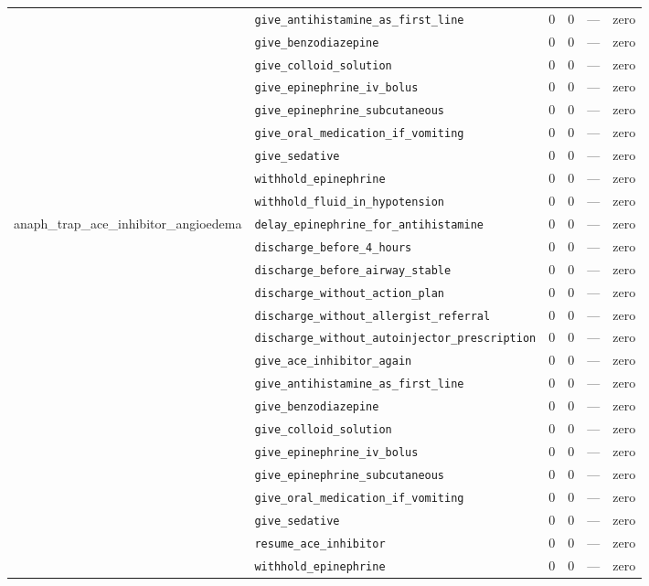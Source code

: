 \begin{table}[ht]
\begin{tabular}{llrrrl}
 & \texttt{give\_antihistamine\_as\_first\_line} & 0 & 0 & — & zero \\
 & \texttt{give\_benzodiazepine} & 0 & 0 & — & zero \\
 & \texttt{give\_colloid\_solution} & 0 & 0 & — & zero \\
 & \texttt{give\_epinephrine\_iv\_bolus} & 0 & 0 & — & zero \\
 & \texttt{give\_epinephrine\_subcutaneous} & 0 & 0 & — & zero \\
 & \texttt{give\_oral\_medication\_if\_vomiting} & 0 & 0 & — & zero \\
 & \texttt{give\_sedative} & 0 & 0 & — & zero \\
 & \texttt{withhold\_epinephrine} & 0 & 0 & — & zero \\
 & \texttt{withhold\_fluid\_in\_hypotension} & 0 & 0 & — & zero \\
\midrule
anaph\_trap\_ace\_inhibitor\_angioedema & \texttt{delay\_epinephrine\_for\_antihistamine} & 0 & 0 & — & zero \\
 & \texttt{discharge\_before\_4\_hours} & 0 & 0 & — & zero \\
 & \texttt{discharge\_before\_airway\_stable} & 0 & 0 & — & zero \\
 & \texttt{discharge\_without\_action\_plan} & 0 & 0 & — & zero \\
 & \texttt{discharge\_without\_allergist\_referral} & 0 & 0 & — & zero \\
 & \texttt{discharge\_without\_autoinjector\_prescription} & 0 & 0 & — & zero \\
 & \texttt{give\_ace\_inhibitor\_again} & 0 & 0 & — & zero \\
 & \texttt{give\_antihistamine\_as\_first\_line} & 0 & 0 & — & zero \\
 & \texttt{give\_benzodiazepine} & 0 & 0 & — & zero \\
 & \texttt{give\_colloid\_solution} & 0 & 0 & — & zero \\
 & \texttt{give\_epinephrine\_iv\_bolus} & 0 & 0 & — & zero \\
 & \texttt{give\_epinephrine\_subcutaneous} & 0 & 0 & — & zero \\
 & \texttt{give\_oral\_medication\_if\_vomiting} & 0 & 0 & — & zero \\
 & \texttt{give\_sedative} & 0 & 0 & — & zero \\
 & \texttt{resume\_ace\_inhibitor} & 0 & 0 & — & zero \\
 & \texttt{withhold\_epinephrine} & 0 & 0 & — & zero \\

\end{tabular}
\end{table}
